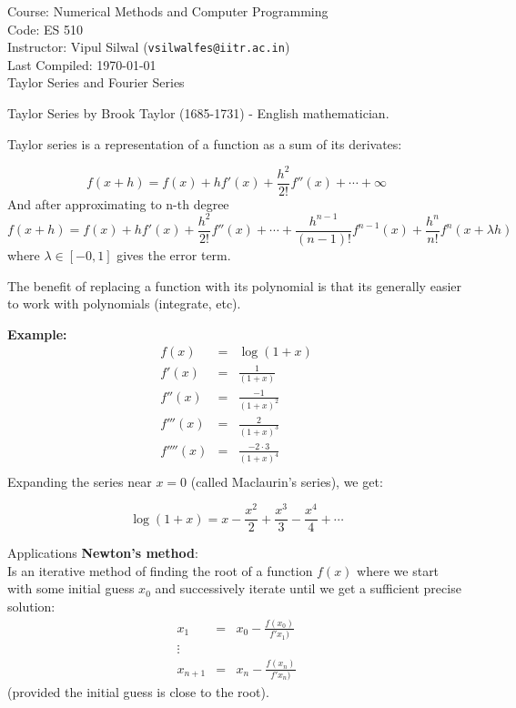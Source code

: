 \documentclass[11pt,titlepage,fleqn]{article}
\begin{document}
\noindent Course: Numerical Methods and Computer Programming\\
\noindent Code: ES 510\\
\noindent Instructor: Vipul Silwal (\verb+vsilwalfes@iitr.ac.in+) \\ 
\noindent Last Compiled: \today \\

{\huge Taylor Series and Fourier Series}

\tableofcontents
\begin{section}{Taylor Series}
by Brook Taylor (1685-1731) - English mathematician.

Taylor series is a representation of a function as a sum of its derivates: 

\begin{equation}
f(x+h) = f(x) + hf'(x) + \frac{h^2}{2!}f''(x) + \cdots + \infty 
\end{equation}
And after approximating to n-th degree
\begin{equation}
f(x+h) = f(x) + hf'(x) + \frac{h^2}{2!}f''(x) + \cdots +  \frac{h^{n-1}}{(n-1)!}f^{n-1}(x) + \frac{h^n}{n!}f^n(x + \lambda h)
\end{equation}
where $\lambda \in [-0,1]$ gives the error term.

The benefit of replacing a function with its polynomial is that its generally easier to work with polynomials (integrate, etc).

{\bf Example:}
\begin{eqnarray*}
f(x) &=& \log(1 + x) \\
f'(x) &=& \frac{1}{(1 + x)} \\
f''(x) &=& \frac{-1}{(1 + x)^2} \\
f'''(x) &=& \frac{2}{(1 + x)^3} \\
f''''(x) &=& \frac{-2 \cdot 3}{(1 + x)^4} \\
\end{eqnarray*}
Expanding the series near $x=0$ (called Maclaurin's series), we get:

\begin{equation*}
\log(1+x) = x - \frac{x^2}{2} + \frac{x^3}{3} - \frac{x^4}{4} + \cdots
\end{equation*}

\begin{subsection}{Applications}
{\bf Newton's method}: \\
Is an iterative method of finding the root of a function $f(x)$ where we start with some initial guess $x_0$ and successively iterate until we get a sufficient precise solution:
\begin{eqnarray}
x_1 &=& x_0 - \frac{f(x_0)}{f'x_1)} \\
\vdots \\
x_{n+1} &=&  x_n-\frac{f(x_n)}{f'x_n)}
\end{eqnarray}
(provided the initial guess is close to the root). 


\end{subsection}
\end{section}
\end{document}
